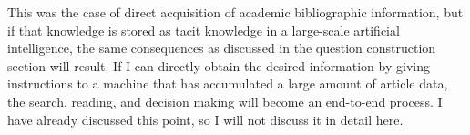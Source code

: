 \documentclass{book}
\begin{document}
This was the case of direct acquisition of academic bibliographic information, but if that knowledge is stored as tacit knowledge in a large-scale artificial intelligence, the same consequences as discussed in the question construction section will result. If I can directly obtain the desired information by giving instructions to a machine that has accumulated a large amount of article data, the search, reading, and decision making will become an end-to-end process. I have already discussed this point, so I will not discuss it in detail here.




\end{document}
